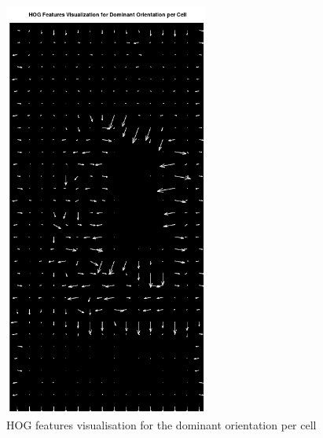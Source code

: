 \documentclass[a4paper]{article}
\begin{document}
\begin{minipage}{0.49\textwidth}
\begin{figure}[H]
    \centering
    \includegraphics[width=0.6\textwidth]{./images/3_hog_features.png}
    \caption{HOG features visualisation for the dominant orientation per cell}
\end{figure}
\end{minipage}
\end{document}
